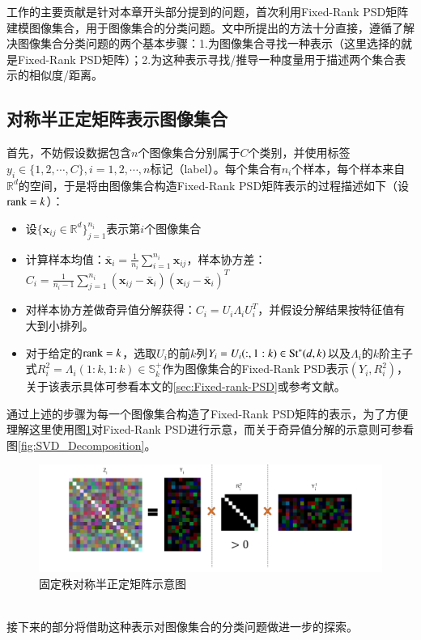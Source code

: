 工作\cite{PSD_WACV}的主要贡献是针对本章开头部分提到的问题，首次利用Fixed-Rank PSD矩阵建模图像集合，用于图像集合的分类问题。文中所提出的方法十分直接，遵循了解决图像集合分类问题的两个基本步骤：1.为图像集合寻找一种表示（这里选择的就是Fixed-Rank PSD矩阵）；2.为这种表示寻找/推导一种度量用于描述两个集合表示的相似度/距离。
\subsection{对称半正定矩阵表示图像集合}
\label{sec:Fixed_Rank_PSD_repr_Imageset}
首先，不妨假设数据包含$n$个图像集合分别属于$C$个类别，并使用标签$y_{i}\in\{1,2,\cdots,C\},i=1,2,\cdots,n$标记（label）。每个集合有$n_i$个样本，每个样本来自$\mathbb{R}^{d}$的空间，于是将由图像集合构造Fixed-Rank PSD矩阵表示的过程描述如下（设${\rm rank}=k$）：
\begin{itemize}
\label{construct_fixed_rank_PSD}
\item 设$\{\bm{x}_{ij} \in \mathbb{R}^{d}\}_{j=1}^{n_i}$表示第$i$个图像集合
\item 计算样本均值：$\bar{\bm{x}}_i=\frac{1}{n_i}\sum_{i=1}^{n_i} \bm{x}_{ij}$，样本协方差：$C_i=\frac{1}{n_i-1}\sum_{j=1}^{n_i}(\bm{x}_{ij}-\bar{\bm{x}}_i)(\bm{x}_{ij}-\bar{\bm{x}}_i)^{T}$
\item 对样本协方差做奇异值分解获得：$C_i=U_i\Lambda_iU_{i}^{T}$，并假设分解结果按特征值有大到小排列。
\item 对于给定的${\rm rank}=k$，选取$U_i$的前$k$列$Y_i=U_i(:,1:k)\in {\rm St}^{*}(d,k)$以及$\Lambda_i$的$k$阶主子式$R_{i}^{2}=\Lambda_{i}(1:k,1:k)\in \mathbb{S}_{k}^{+}$作为图像集合的Fixed-Rank PSD表示$(Y_i,R_{i}^{2})$，关于该表示具体可参看本文的\ref{sec:Fixed-rank-PSD}或参考文献\cite{PSD_Riemannian}。
\end{itemize}
通过上述的步骤为每一个图像集合构造了Fixed-Rank PSD矩阵的表示，为了方便理解这里使用图\ref{fig:FRPSD}对Fixed-Rank PSD进行示意，而关于奇异值分解的示意则可参看图\ref{fig:SVD_Decomposition}。
\begin{figure}[hbt]
	\centering
	\includegraphics[width=\linewidth]{source/FRPSD.png}
	\caption{固定秩对称半正定矩阵示意图}
	\label{fig:FRPSD}
\end{figure}\\
接下来的部分将借助这种表示对图像集合的分类问题做进一步的探索。
